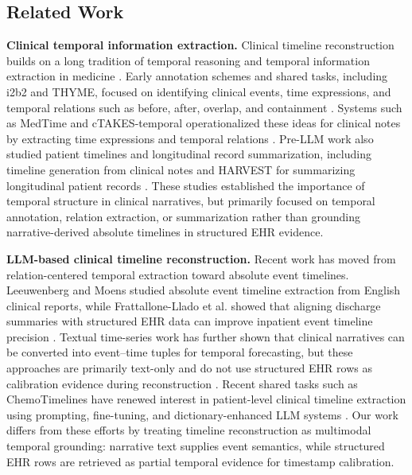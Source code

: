 \subsection{Related Work}
\label{ch08:sec:related_work}


\textbf{Clinical temporal information extraction.}
Clinical timeline reconstruction builds on a long tradition of temporal reasoning and temporal information extraction in medicine \cite{ch08:kohane1987temporal,zhou2007temporal}.
Early annotation schemes and shared tasks, including i2b2 and THYME, focused on identifying clinical events, time expressions, and temporal relations such as before, after, overlap, and containment \cite{ch08:uzuner20112010,sun2013evaluating,sun2013annotating,ch08:styler2014temporal}.
Systems such as MedTime and cTAKES-temporal operationalized these ideas for clinical notes by extracting time expressions and temporal relations \cite{lin2013medtime,savova2010mayo,lin2016multilayered}.
Pre-LLM work also studied patient timelines and longitudinal record summarization, including timeline generation from clinical notes and HARVEST for summarizing longitudinal patient records \cite{nikfarjam2013towards,hirsch2015harvest}.
These studies established the importance of temporal structure in clinical narratives, but primarily focused on temporal annotation, relation extraction, or summarization rather than grounding narrative-derived absolute timelines in structured EHR evidence.


\noindent
\textbf{LLM-based clinical timeline reconstruction.}
Recent work has moved from relation-centered temporal extraction toward absolute event timelines.
Leeuwenberg and Moens studied absolute event timeline extraction from English clinical reports, while Frattallone-Llado et al. showed that aligning discharge summaries with structured EHR data can improve inpatient event timeline precision \cite{leeuwenberg2020towards,ch08:frattallone2024using}.
Textual time-series work has further shown that clinical narratives can be converted into event--time tuples for temporal forecasting, but these approaches are primarily text-only and do not use structured EHR rows as calibration evidence during reconstruction \cite{ch08:wang2025large,noroozizadeh2026reconstructing,ch08:noroozizadeh2026forecasting,ch08:kumar2026temporally}.
Recent shared tasks such as ChemoTimelines have renewed interest in patient-level clinical timeline extraction using prompting, fine-tuning, and dictionary-enhanced LLM systems \cite{yao2025chemotimelines,zhang2025uwbionlp}.
Our work differs from these efforts by treating timeline reconstruction as multimodal temporal grounding: narrative text supplies event semantics, while structured EHR rows are retrieved as partial temporal evidence for timestamp calibration.


